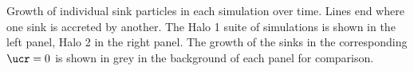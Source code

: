 \label{fig:sinks} Growth of individual sink particles in each simulation over time. Lines end where one sink is accreted by another. The Halo 1 suite of simulations is shown in the left panel, Halo 2 in the right panel.  The growth of the sinks in the corresponding $\ucr=0$ is shown in grey in the background of each panel for comparison.